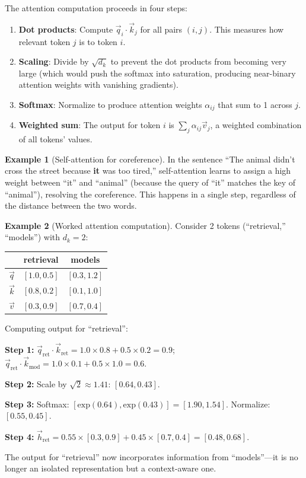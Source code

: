 \documentclass[11pt,a4paper]{article}
\theoremstyle{definition}
\newtheorem{example}{Example}[section]
\theoremstyle{plain}
\begin{document}
The attention computation proceeds in four steps:
\begin{enumerate}
    \item \textbf{Dot products}: Compute $\vec{q}_i \cdot \vec{k}_j$ for all pairs $(i, j)$. This measures how relevant token $j$ is to token $i$.
    \item \textbf{Scaling}: Divide by $\sqrt{d_k}$ to prevent the dot products from becoming very large (which would push the softmax into saturation, producing near-binary attention weights with vanishing gradients).
    \item \textbf{Softmax}: Normalize to produce attention weights $\alpha_{ij}$ that sum to 1 across $j$.
    \item \textbf{Weighted sum}: The output for token $i$ is $\sum_j \alpha_{ij} \vec{v}_j$, a weighted combination of all tokens' values.
\end{enumerate}

\begin{example}[Self-attention for coreference]
\label{ex:attn}
In the sentence ``The animal didn't cross the street because \textbf{it} was too tired,'' self-attention learns to assign a high weight between ``it'' and ``animal'' (because the query of ``it'' matches the key of ``animal''), resolving the coreference. This happens in a single step, regardless of the distance between the two words.
\end{example}

\begin{example}[Worked attention computation]
\label{ex:attn-worked}
Consider 2 tokens (``retrieval,'' ``models'') with $d_k = 2$:

\begin{center}
\small
\begin{tabular}{lcc}
\toprule
& retrieval & models \\
\midrule
$\vec{q}$ & $[1.0, 0.5]$ & $[0.3, 1.2]$ \\
$\vec{k}$ & $[0.8, 0.2]$ & $[0.1, 1.0]$ \\
$\vec{v}$ & $[0.3, 0.9]$ & $[0.7, 0.4]$ \\
\bottomrule
\end{tabular}
\end{center}

Computing output for ``retrieval'':

\textbf{Step 1:} $\vec{q}_\text{ret} \cdot \vec{k}_\text{ret} = 1.0 \times 0.8 + 0.5 \times 0.2 = 0.9$; \quad $\vec{q}_\text{ret} \cdot \vec{k}_\text{mod} = 1.0 \times 0.1 + 0.5 \times 1.0 = 0.6$.

\textbf{Step 2:} Scale by $\sqrt{2} \approx 1.41$: $[0.64, 0.43]$.

\textbf{Step 3:} Softmax: $[\text{exp}(0.64), \text{exp}(0.43)] = [1.90, 1.54]$. Normalize: $[0.55, 0.45]$.

\textbf{Step 4:} $\vec{h}_\text{ret} = 0.55 \times [0.3, 0.9] + 0.45 \times [0.7, 0.4] = [0.48, 0.68]$.

The output for ``retrieval'' now incorporates information from ``models''---it is no longer an isolated representation but a context-aware one.
\end{example}
\end{document}
